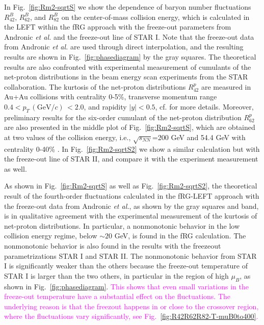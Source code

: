 \documentclass[%
reprint,
superscriptaddress,
showpacs,preprintnumbers,
 amsmath,amssymb,
 aps,
prd,
]{revtex4-1}
\def\Fig#1{Fig.~\ref{#1}} \def\Tab#1{Tab.~\ref{#1}}
\newcommand{\colfab}[1]{\textcolor{magenta}{#1}}
\begin{document}
In \Fig{fig:Rm2-sqrtS} we show the dependence of baryon number fluctuations $R^{B}_{42}$, $R^{B}_{62}$, and $R^{B}_{82}$ on the center-of-mass collision energy, which is calculated in the LEFT within the fRG approach with the freeze-out parameters from Andronic {\it et al.} \cite{Andronic:2017pug} and the freeze-out line of STAR I. Note that the freeze-out data from Andronic {\it et al.} are used through direct interpolation, and the resulting results are shown in \Fig{fig:phasediagram} by the gray squares. The theoretical results are also confronted with experimental measurement of cumulants of the net-proton distributions in the beam energy scan experiments from the STAR collaboration. The kurtosis of the net-proton distributions $R^{p}_{42}$ are measured in Au+Au collisions with centrality 0-5\%, transverse momentum range $0.4< p_T\,(\mathrm{GeV}/c)\,<2.0$, and rapidity $|y|<0.5$, cf. \cite{Adam:2020unf} for more details. Moreover, preliminary results for the six-order cumulant of the net-proton distribution $R^{p}_{62}$ are also presented in the middle plot of \Fig{fig:Rm2-sqrtS}, which are obtained at two values of the collision energy, i.e., $\sqrt{s_{NN}}$=200 GeV and 54.4 GeV with centrality 0-40\% \cite{Nonaka:2020crv,Pandav:2020uzx}. In \Fig{fig:Rm2-sqrtS2} we show a similar calculation but with the freeze-out line of STAR II, and compare it with the experiment measurement as well.

As shown in \Fig{fig:Rm2-sqrtS} as well as \Fig{fig:Rm2-sqrtS2}, the theoretical result of the fourth-order fluctuations calculated in the fRG-LEFT approach with the freeze-out data from Andronic {\it et al.}, as shown by the gray squares and band, is in qualitative agreement with the experimental measurement of the kurtosis of net-proton distributions.  In particular, a nonmonotonic behavior in the low collision energy regime, below $\sim 20$ GeV, is found in the fRG calculation. The nonmonotonic behavior is also found in the results with the freezeout parametrizations STAR I and STAR II. The nonmonotonic behavior from STAR I is significantly weaker than the others because the freeze-out temperature of STAR I is larger than the two others, in particular in the region of high $\mu_B$, as shown in \Fig{fig:phasediagram}. 
\colfab{This shows that even small variations in the freeze-out temperature have a substantial effect on the fluctuations. The underlying reason is that the freezout happens in or close to the crossover region, where the fluctuations vary significantly, see \Fig{fig:R42R62R82-T-muB0to400}.}
\end{document}
